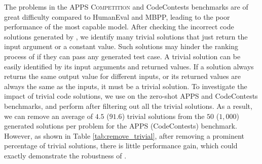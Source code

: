 \begin{table}[t]
    \centering
    \caption{Pass@$k$ ($\%$) results on the zero-shot APPS and CodeContests benchmarks using \davincitwo and \ours with/without the trivial code solutions filtered. The numbers in {\textcolor{red}{red}} indicate the absolute improvements after filtering the trivial solutions.}
    \label{tab:remove_trivial}
\end{table}

The problems in the APPS \textsc{Competition} and CodeContests benchmarks are of great difficulty compared to HumanEval and MBPP, leading to the poor performance of the most capable \davincitwo model. After checking the incorrect code solutions generated by \davincitwo, we identify many trivial solutions that just return the input argument or a constant value. Such solutions may hinder the ranking process of \ours if they can pass any generated test case. A trivial solution can be easily identified by its input arguments and returned values. If a solution always returns the same output value for different inputs, or its returned values are always the same as the inputs, it must be a trivial solution. To investigate the impact of trivial code solutions, we use \davincitwo on the zero-shot APPS and CodeContests benchmarks, and perform \ours after filtering out all the trivial solutions. 
As a result, we can remove an average of $4.5$ ($91.6$) trivial solutions from the $50$ ($1,000$) generated solutions per problem for the APPS (CodeContests) benchmark. However, as shown in Table \ref{tab:remove_trivial}, after removing a prominent percentage of trivial solutions, there is little performance gain, which could exactly demonstrate the robustness of \ours.


